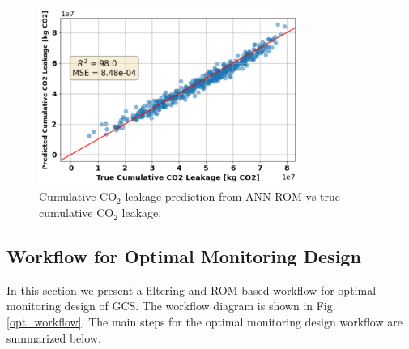 \documentclass[a4paper,fleqn]{cas-sc}
\begin{document}
\begin{figure}
    \centering
    \includegraphics[width=8.5cm]{figs/Figure 3.pdf}
    \caption{Cumulative CO$_2$ leakage prediction from ANN ROM vs true cumulative CO$_2$ leakage.}
    \label{rom_train}
\end{figure}

\subsection{Workflow for Optimal Monitoring Design}
In this section we present a filtering and ROM based workflow for optimal monitoring design of GCS. The workflow diagram is shown in Fig. \ref{opt_workflow}. The main steps for the optimal monitoring design workflow are summarized below.
\end{document}

